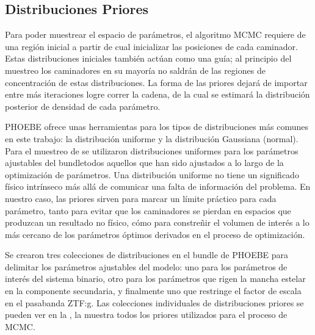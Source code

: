 \subsection{Distribuciones Priores}

Para poder muestrear el espacio de parámetros, el algoritmo MCMC requiere de una
región inicial a partir de cual inicializar las posiciones de cada caminador.
Estas distribuciones iniciales también actúan como una guía; al principio del
muestreo los caminadores en su mayoría no saldrán de las regiones de
concentración de estas distribuciones. La forma de las priores dejará de
importar entre más iteraciones logre correr la cadena, de la cual se
estimará la distribución posterior de densidad de cada parámetro.

PHOEBE ofrece unas herramientas para los tipos de distribuciones más comunes en
este trabajo: la distribución uniforme y la distribución Gaussiana (normal).
Para el muestreo de \atoObjId se utilizaron distribuciones uniformes para los
parámetros ajustables del bundle\textemdash todos aquellos que han sido
ajustados a lo largo de la optimización de parámetros. Una distribución uniforme
no tiene un significado físico intrínseco más allá de comunicar una falta de
información del problema. En nuestro caso, las priores sirven para marcar un
límite práctico para cada parámetro, tanto para evitar que los caminadores se
pierdan en espacios que produzcan un resultado no físico, cómo para constreñir
el volumen de interés a lo más cercano de los parámetros óptimos derivados en el
proceso de optimización. 

Se crearon tres colecciones de distribuciones en el bundle de PHOEBE para
delimitar los parámetros ajustables del modelo: uno para los parámetros de
interés del sistema binario, otro para los parámetros que rigen la mancha
estelar en la componente secundaria, y finalmente uno que restringe el factor de
escala en el pasabanda ZTF:g. Las colecciones individuales de distribuciones
priores se pueden ver en la , la
muestra todos los priores utilizados para el proceso de MCMC.

